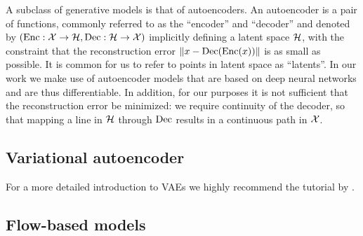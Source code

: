 \documentclass[../main.tex]{subfiles}
\begin{document}
A subclass of generative models is that of autoencoders.
An autoencoder is a pair of functions, commonly referred to as the ``encoder'' and ``decoder'' and denoted by $(\operatorname{Enc}: \mathcal{X} \to \mathcal{H}, \operatorname{Dec}: \mathcal{H} \to \mathcal{X})$ implicitly defining a latent space $\mathcal{H}$, with the constraint that the reconstruction error $\left\lVert x - \operatorname{Dec}(\operatorname{Enc}(x))\right\rVert$ is as small as possible.
It is common for us to refer to points in latent space as ``latents''.
In our work we make use of autoencoder models that are based on deep neural networks and are thus differentiable.
In addition, for our purposes it is not sufficient that the reconstruction error be minimized: we require continuity of the decoder, so that mapping a line in $\mathcal{H}$ through $\operatorname{Dec}$ results in a continuous path in $\mathcal{X}$.

\subsection{Variational autoencoder}


For a more detailed introduction to VAEs we highly recommend the tutorial by \citeauthor{doerschTutorial2021} \cite{doerschTutorial2021}.

\subsection{Flow-based models}
\label{bg/nf}
\end{document}
